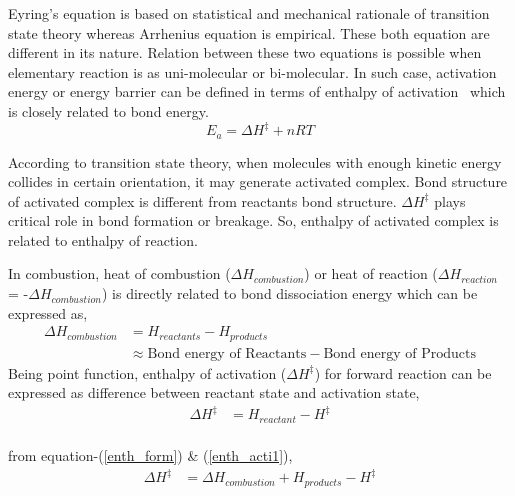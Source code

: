\documentclass[preprint,12pt]{elsarticle}
\begin{document}
		Eyring's equation is based on statistical and mechanical rationale of transition state theory whereas Arrhenius equation is empirical. These both equation are different in its nature. Relation between these two equations is possible when elementary reaction is as uni-molecular or bi-molecular. In such case, activation energy or  energy barrier can be defined in terms of enthalpy of activation~\cite{modernbook} which is closely related to bond energy.
		\begin{equation}\label{acti_entha}
		E_a = \Delta H^{\ddagger} + nRT
		\end{equation}
		
		 According to transition state theory, when molecules with enough kinetic energy collides in certain orientation, it may generate activated complex. Bond structure of activated complex  is different from reactants bond structure. $\Delta H^{\ddagger}$ plays critical role in bond formation or breakage. So, enthalpy of activated complex is related to enthalpy of reaction. 
		 
		 		 
		 In combustion, heat of combustion  ($\Delta H_{combustion}$) or heat of reaction  ($\Delta H_{reaction}$ = -$\Delta H_{combustion}$) is directly related to bond dissociation energy \cite{bond_energy} which can be expressed as,
		\begin{equation}\label{enth_form}
		\begin{aligned}
		\Delta H_{combustion} &= H_{reactants} - H_{products} \\
		&\approx \text{Bond energy of Reactants}- \text{Bond energy of Products}
		\end{aligned}
		\end{equation}
		Being point function, enthalpy of activation ($\Delta H^\ddagger$) for forward reaction can be expressed as difference between reactant state and activation state,
		\begin{equation}\label{enth_acti1}
		\begin{aligned}
		\Delta H^{\ddagger} &= H_{reactant} - H^{\ddagger} \\
		\end{aligned}
		\end{equation}
		
		from equation-(\ref{enth_form}) \&  (\ref{enth_acti1}),
		\begin{equation}\label{enth_acti2}
		\begin{aligned}
		\Delta H^{\ddagger} &=\Delta H_{combustion} + H_{products} - H^{\ddagger} \\
		\end{aligned}
		\end{equation}
		
\end{document}
